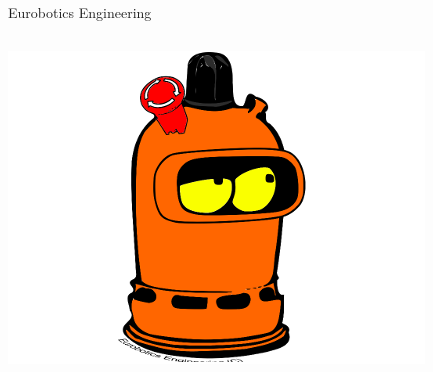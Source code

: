 \documentclass{beamer}
\begin{document}
\begin{frame}{Eurobotics Engineering}

\begin{columns}
\centering
\includegraphics[width=\textwidth]{bombona}

\centering
{}


\end{columns}
\end{frame}
\end{document}

